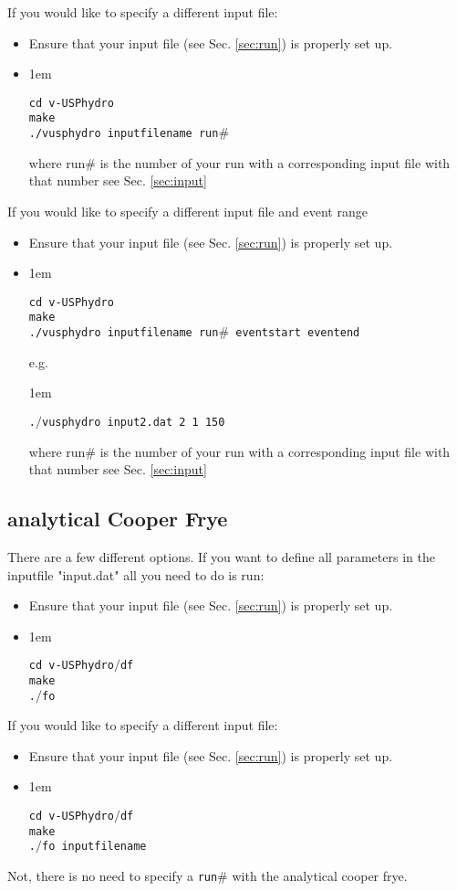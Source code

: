 \documentclass[article]{revtex4-1}
\newcommand{\code}[1]{\bigskip\noindent\begin{addmargin}[3em]{1em}\begin{linenumbers}\texttt{#1}\end{linenumbers}\end{addmargin}\bigskip}
\newcommand{\nocode}[1]{\texttt{#1}}
\begin{document}
If you would like to specify a different input file:

\begin{itemize}
\item Ensure that your input file (see Sec. \ref{sec:run}) is properly set up.
\item \code{cd v-USPhydro\\
make\\
./vusphydro inputfilename  run$\#$}
where run$\#$ is the number of your run with a corresponding input file with that number see Sec. \ref{sec:input}
\end{itemize}

If you would like to specify a different input file and event range

\begin{itemize}
\item Ensure that your input file (see Sec. \ref{sec:run}) is properly set up.
\item \code{cd v-USPhydro\\
make\\
./vusphydro inputfilename run$\#$ event\textunderscore start event\textunderscore end} e.g. \code{.$/$vusphydro input2.dat 2 1 150}
where run$\#$ is the number of your run with a corresponding input file with that number see Sec. \ref{sec:input}
\end{itemize}

\subsection{analytical Cooper Frye}

There are a few different options.  If you want to define all parameters in the inputfile "input.dat" all you need to do is run:

\begin{itemize}
\item Ensure that your input file (see Sec. \ref{sec:run}) is properly set up.
\item \code{cd v-USPhydro$/$df\\
make\\
.$/$fo}
\end{itemize}

If you would like to specify a different input file:

\begin{itemize}
\item Ensure that your input file (see Sec. \ref{sec:run}) is properly set up.
\item \code{cd v-USPhydro$/$df\\
make\\
.$/$fo inputfilename}
\end{itemize}
Not, there is no need to specify a \nocode{run$\#$} with the analytical cooper frye.
\end{document}
